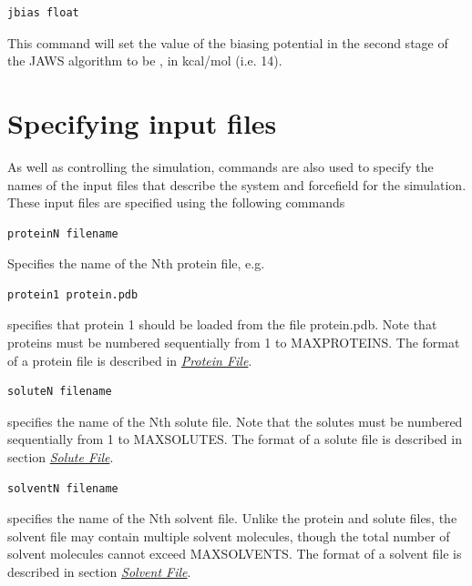 \documentclass[letterpaper,10pt,english]{sphinxmanual}
\begin{document}
\begin{Verbatim}[commandchars=\\\{\}]
jbias float
\end{Verbatim}

This command will set the value of the biasing potential in the second stage of the JAWS algorithm to be , in kcal/mol (i.e. 14).


\section{Specifying input files}
\label{protoms:specifying-input-files}\label{protoms:incmd}
As well as controlling the simulation, commands are also used to specify the names of the input files that describe the system and forcefield for the simulation. These input files are specified using the following commands

\begin{Verbatim}[commandchars=\\\{\}]
proteinN filename
\end{Verbatim}

Specifies the name of the Nth protein file, e.g.

\begin{Verbatim}[commandchars=\\\{\}]
protein1 protein.pdb
\end{Verbatim}

specifies that protein 1 should be loaded from the file protein.pdb. Note that proteins must be numbered sequentially from 1 to MAXPROTEINS. The format of a protein file is described in {\hyperref[protoms:protpdb]{\emph{Protein File}}}.

\begin{Verbatim}[commandchars=\\\{\}]
soluteN filename
\end{Verbatim}

specifies the name of the Nth solute file. Note that the solutes must be numbered sequentially from 1 to MAXSOLUTES. The format of a solute file is described in section {\hyperref[protoms:solpdb]{\emph{Solute File}}}.

\begin{Verbatim}[commandchars=\\\{\}]
solventN filename
\end{Verbatim}

specifies the name of the Nth solvent file. Unlike the protein and solute files, the solvent file may contain multiple solvent molecules, though the total number of solvent molecules cannot exceed MAXSOLVENTS. The format of a solvent file is described in section {\hyperref[protoms:solventpdb]{\emph{Solvent File}}}.
\end{document}

